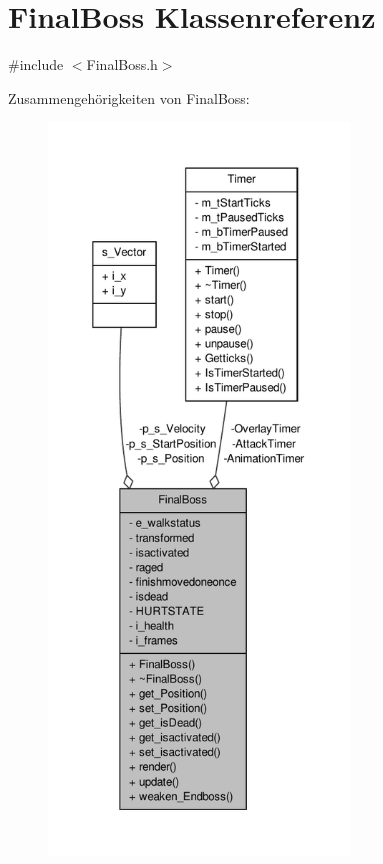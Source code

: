 \hypertarget{class_final_boss}{\section{Final\-Boss Klassenreferenz}
\label{class_final_boss}
}


{\ttfamily \#include $<$Final\-Boss.\-h$>$}



Zusammengehörigkeiten von Final\-Boss\-:
\nopagebreak
\begin{figure}[H]
\begin{center}
\leavevmode
\includegraphics[height=550pt]{class_final_boss__coll__graph}
\end{center}
\end{figure}
